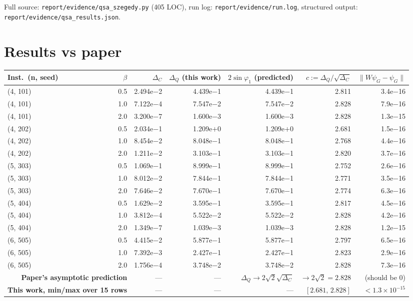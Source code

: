 \documentclass[11pt]{article}
\begin{document}
Full source: \texttt{report/evidence/qsa\_szegedy.py} (405 LOC), run log:
\texttt{report/evidence/run.log}, structured output:
\texttt{report/evidence/qsa\_results.json}.

\section{Results vs paper}
\begin{table}[h!]
\centering
\small
\begin{tabular}{@{}l r r r r r r@{}}
\toprule
Inst.\ (n, seed) & $\beta$ & $\Delta_C$ & $\Delta_Q$ (this work) & $2\sin\varphi_1$ (predicted) & $c := \Delta_Q/\sqrt{\Delta_C}$ & $\|W\psi_G-\psi_G\|$ \\
\midrule
(4, 101) & 0.5 & 2.494e$-$2 & 4.439e$-$1 & 4.439e$-$1 & 2.811 & 3.4e$-$16 \\
(4, 101) & 1.0 & 7.122e$-$4 & 7.547e$-$2 & 7.547e$-$2 & 2.828 & 7.9e$-$16 \\
(4, 101) & 2.0 & 3.200e$-$7 & 1.600e$-$3 & 1.600e$-$3 & 2.828 & 1.3e$-$15 \\
(4, 202) & 0.5 & 2.034e$-$1 & 1.209e$+$0 & 1.209e$+$0 & 2.681 & 1.5e$-$16 \\
(4, 202) & 1.0 & 8.454e$-$2 & 8.048e$-$1 & 8.048e$-$1 & 2.768 & 4.4e$-$16 \\
(4, 202) & 2.0 & 1.211e$-$2 & 3.103e$-$1 & 3.103e$-$1 & 2.820 & 3.7e$-$16 \\
(5, 303) & 0.5 & 1.069e$-$1 & 8.999e$-$1 & 8.999e$-$1 & 2.752 & 2.6e$-$16 \\
(5, 303) & 1.0 & 8.012e$-$2 & 7.844e$-$1 & 7.844e$-$1 & 2.771 & 3.5e$-$16 \\
(5, 303) & 2.0 & 7.646e$-$2 & 7.670e$-$1 & 7.670e$-$1 & 2.774 & 6.3e$-$16 \\
(5, 404) & 0.5 & 1.629e$-$2 & 3.595e$-$1 & 3.595e$-$1 & 2.817 & 4.5e$-$16 \\
(5, 404) & 1.0 & 3.812e$-$4 & 5.522e$-$2 & 5.522e$-$2 & 2.828 & 4.2e$-$16 \\
(5, 404) & 2.0 & 1.349e$-$7 & 1.039e$-$3 & 1.039e$-$3 & 2.828 & 1.2e$-$15 \\
(6, 505) & 0.5 & 4.415e$-$2 & 5.877e$-$1 & 5.877e$-$1 & 2.797 & 6.5e$-$16 \\
(6, 505) & 1.0 & 7.392e$-$3 & 2.427e$-$1 & 2.427e$-$1 & 2.823 & 2.9e$-$16 \\
(6, 505) & 2.0 & 1.756e$-$4 & 3.748e$-$2 & 3.748e$-$2 & 2.828 & 7.3e$-$16 \\
\midrule
\multicolumn{2}{r}{\textbf{Paper's asymptotic prediction}}
                            & --- & --- & $\Delta_Q \to 2\sqrt{2}\sqrt{\Delta_C}$ & $\to 2\sqrt{2}=2.828$ & (should be 0) \\
\multicolumn{2}{r}{\textbf{This work, min/max over 15 rows}}
                            & --- & --- & --- & $[2.681,\,2.828]$ & $< 1.3\times 10^{-15}$ \\
\bottomrule
\end{tabular}
\end{table}
\end{document}
